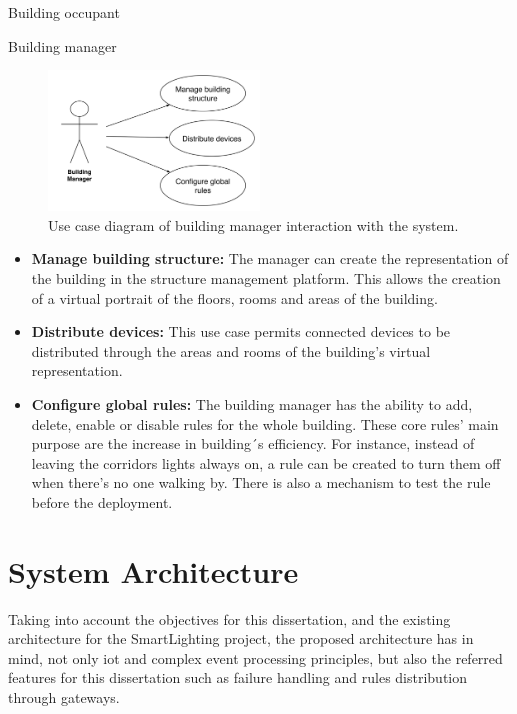 \begin{Paragraph}{Building occupant}
\begin{itemize}
\end{itemize}
\end{Paragraph}


\begin{Paragraph}{Building manager}
	
	
	\begin{figure}[H]
		\centering
		\includegraphics[width=0.5\textwidth]{figures/usecase2.png}
		\caption{Use case diagram of building manager interaction with the system.}
		\label{fig:manager}
	\end{figure}
\begin{itemize}
	\item{\textbf{Manage building structure:}	The manager can create the representation of the building in the structure management platform. This allows the creation of a virtual portrait of the floors, rooms and areas of the building.}
	\item{\textbf{Distribute devices:}	This use case permits connected devices to be distributed through the areas and rooms of the building’s virtual representation.}
	\item{\textbf{Configure global rules:}	The building manager has the ability to add, delete, enable or disable rules for the whole building. These core rules’ main purpose are the increase in building´s efficiency. For instance, instead of leaving the corridors lights always on, a rule can be created to turn them off when there’s no one walking by. There is also a mechanism to test the rule before the deployment.}
\end{itemize}
\end{Paragraph}


\section{System Architecture}
\label{Architecture:Architecture}


Taking into account the objectives for this dissertation, and the existing architecture for the SmartLighting project, the proposed architecture has in mind, not only \ac{iot} and complex event processing principles, but also the referred features for this dissertation such as failure handling and rules distribution through gateways.

